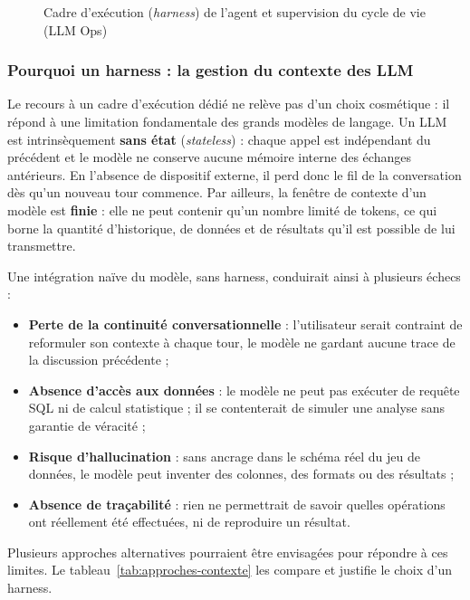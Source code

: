 \begin{figure}[H]
\centering
{}
\caption{Cadre d'exécution (\textit{harness}) de l'agent et supervision du cycle de vie (LLM Ops)}
\label{fig:harness}
\end{figure}
\subsubsection{Pourquoi un harness : la gestion du contexte des LLM}

Le recours à un cadre d'exécution dédié ne relève pas d'un choix cosmétique : il répond à une limitation fondamentale des grands modèles de langage. Un LLM est intrinsèquement \textbf{sans état} (\textit{stateless}) : chaque appel est indépendant du précédent et le modèle ne conserve aucune mémoire interne des échanges antérieurs. En l'absence de dispositif externe, il perd donc le fil de la conversation dès qu'un nouveau tour commence. Par ailleurs, la fenêtre de contexte d'un modèle est \textbf{finie} : elle ne peut contenir qu'un nombre limité de tokens, ce qui borne la quantité d'historique, de données et de résultats qu'il est possible de lui transmettre.

Une intégration naïve du modèle, sans harness, conduirait ainsi à plusieurs échecs :

\begin{itemize}
  \item \textbf{Perte de la continuité conversationnelle} : l'utilisateur serait contraint de reformuler son contexte à chaque tour, le modèle ne gardant aucune trace de la discussion précédente ;
  \item \textbf{Absence d'accès aux données} : le modèle ne peut pas exécuter de requête SQL ni de calcul statistique ; il se contenterait de simuler une analyse sans garantie de véracité ;
  \item \textbf{Risque d'hallucination} : sans ancrage dans le schéma réel du jeu de données, le modèle peut inventer des colonnes, des formats ou des résultats ;
  \item \textbf{Absence de traçabilité} : rien ne permettrait de savoir quelles opérations ont réellement été effectuées, ni de reproduire un résultat.
\end{itemize}

Plusieurs approches alternatives pourraient être envisagées pour répondre à ces limites. Le tableau~\ref{tab:approches-contexte} les compare et justifie le choix d'un harness.

